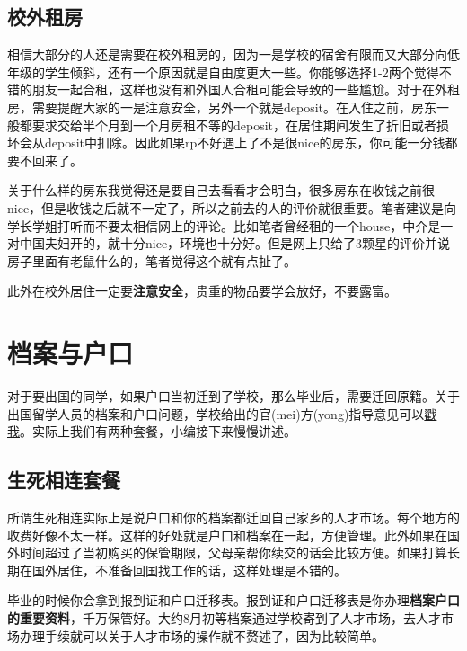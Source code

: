 \subsection{校外租房}
相信大部分的人还是需要在校外租房的，因为一是学校的宿舍有限而又大部分向低年级的学生倾斜，还有一个原因就是自由度更大一些。你能够选择1-2两个觉得不错的朋友一起合租，这样也没有和外国人合租可能会导致的一些尴尬。对于在外租房，需要提醒大家的一是注意安全，另外一个就是deposit。在入住之前，房东一般都要求交给半个月到一个月房租不等的deposit，在居住期间发生了折旧或者损坏会从deposit中扣除。因此如果rp不好遇上了不是很nice的房东，你可能一分钱都要不回来了。\par
关于什么样的房东我觉得还是要自己去看看才会明白，很多房东在收钱之前很nice，但是收钱之后就不一定了，所以之前去的人的评价就很重要。笔者建议是向学长学姐打听而不要太相信网上的评论。比如笔者曾经租的一个house，中介是一对中国夫妇开的，就十分nice，环境也十分好。但是网上只给了3颗星的评价并说房子里面有老鼠什么的，笔者觉得这个就有点扯了。\par
此外在校外居住一定要\textbf{注意安全}，贵重的物品要学会放好，不要露富。
\section{档案与户口}
对于要出国的同学，如果户口当初迁到了学校，那么毕业后，需要迁回原籍。关于出国留学人员的档案和户口问题，学校给出的官(mei)方(yong)指导意见可以\href{https://www.evernote.com/shard/s51/sh/c4b48b91-d3e3-44c3-8921-1448b76d3e5f/e7fbecd380cc0a83277316c2949609e5}{戳我}。实际上我们有两种套餐，小编接下来慢慢讲述。
\subsection{生死相连套餐}
所谓生死相连实际上是说户口和你的档案都迁回自己家乡的人才市场。每个地方的收费好像不太一样。这样的好处就是户口和档案在一起，方便管理。此外如果在国外时间超过了当初购买的保管期限，父母亲帮你续交的话会比较方便。如果打算长期在国外居住，不准备回国找工作的话，这样处理是不错的。\par
毕业的时候你会拿到报到证和户口迁移表。报到证和户口迁移表是你办理\textbf{档案户口的重要资料}，千万保管好。大约8月初等档案通过学校寄到了人才市场，去人才市场办理手续就可以关于人才市场的操作就不赘述了，因为比较简单。
